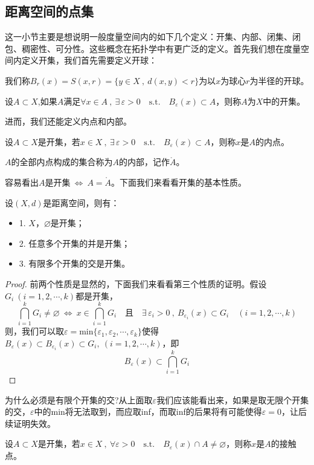 \subsection{距离空间的点集} \label{pointset}
这一小节主要是想说明一般度量空间内的如下几个定义：开集、内部、闭集、闭包、稠密性、可分性。这些概念在拓扑学中有更广泛的定义。首先我们想在度量空间内定义开集，我们首先需要定义开球：
\begin{definition}[开球]
我们称$B_r(x)=S(x,r)=\{y \in X \ , \ d(x,y)<r\}$为以$x$为球心$r$为半径的开球。
\end{definition}
\begin{definition}[开集]
设$A \subset X$,如果$A$满足$\forall x \in A \ , \ \exists \, \varepsilon>0 \quad \text{s.t.} \quad B_{\varepsilon}(x) \subset A$，则称$A$为$X$中的开集。
\end{definition}
进而，我们还能定义内点和内部。
\begin{definition}[内点]
设$A \subset X$是开集，若$x \in X \ , \ \exists \, \varepsilon>0 \quad \text{s.t.} \quad B_{\varepsilon}(x) \subset A$，则称$x$是$A$的内点。
\end{definition}
\begin{definition}[内部]
$A$的全部内点构成的集合称为$A$的内部，记作$\mathring{A}$。
\end{definition}
容易看出$A$是开集$ \ \Leftrightarrow \ A=\mathring{A}$。下面我们来看看开集的基本性质。
\begin{lemma}\label{theorem:2.2}
设$(X,d)$是距离空间，则有：
\begin{itemize}
    \item 1. $X$，$\varnothing$是开集；
    \item 2. 任意多个开集的并是开集；
    \item 3. 有限多个开集的交是开集。
\end{itemize}
\end{lemma}
\begin{proof}
前两个性质是显然的，下面我们来看看第三个性质的证明。假设$G_i \ (i=1,2,\cdots,k)$都是开集，
\[\bigcap_{i=1}^kG_i \neq \varnothing \ \Leftrightarrow \ x \in \bigcap_{i=1}^kG_i  \quad \text{且} \quad \exists \, \varepsilon_i >0 \ , \ B_{\varepsilon_i}(x) \subset G_i \quad (i=1,2,\cdots,k)\]
则，我们可以取$\varepsilon=\text{min}\{\varepsilon_1,\varepsilon_2,\cdots,\varepsilon_k\}$使得$B_{\varepsilon}(x) \subset B_{\varepsilon_i}(x) \subset G_i, \ (i=1,2,\cdots,k)$，即
\[B_{\varepsilon}(x) \subset \bigcap_{i=1}^kG_i\]
\end{proof}

为什么必须是有限个开集的交?从上面取$\varepsilon$我们应该能看出来，如果是取无限个开集的交，$\varepsilon$中的min将无法取到，而应取inf，而取inf的后果将有可能使得$\varepsilon=0$，让后续证明失效。
\begin{definition}[接触点]
设$A \subset X$是开集，若$x \in X \ , \ \forall \varepsilon>0 \quad \text{s.t.} \quad B_{\varepsilon}(x) \cap A \neq \varnothing$，则称$x$是$A$的接触点。
\end{definition}

